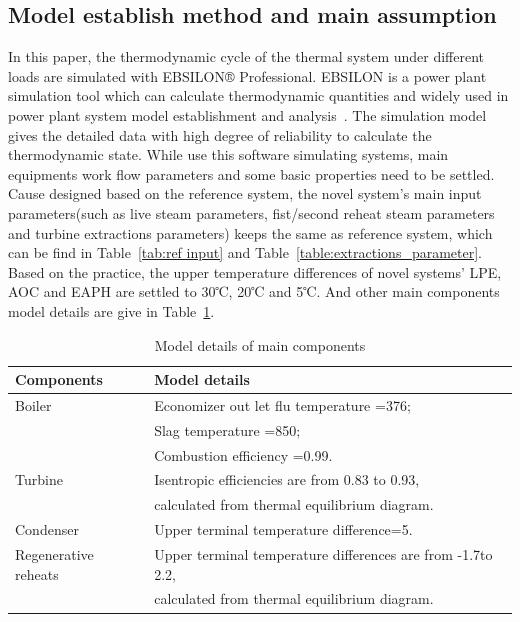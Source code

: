 \documentclass[preprint,12pt]{elsarticle}
\begin{document}
\subsection{Model establish method and main assumption}
\label{ssub3:modle description}
In this paper, the thermodynamic cycle of the thermal system under different loads are simulated with EBSILON® Professional.
EBSILON is a power plant simulation tool which can calculate thermodynamic quantities and widely used in power plant system model establishment and analysis~\cite{Li2015Integrated,Yao2017Multi}. 
The simulation model gives the detailed data with high degree of reliability to calculate the thermodynamic state.
While use this software simulating systems, main equipments work flow parameters and some basic properties need to be settled.
Cause designed based on the reference system, the novel system's main input parameters(such as live steam parameters, fist/second reheat steam parameters and turbine extractions parameters) keeps the same as reference system, which can be find in Table~\ref{tab:ref input} and Table~\ref{table:extractions_parameter}.
Based on the practice, the upper temperature differences of novel systems' LPE, AOC and EAPH are settled to 30℃, 20℃ and 5℃. 
And other main components model details are give in Table~\ref{table:model_details}. 

\begin{table}
\caption{Model details of main components}
\label{table:model_details}
\begin{centering}
\begin{tabular}{ll}
\toprule 
Components 				& Model details\tabularnewline
\midrule
Boiler         			& Economizer out let flu temperature =376\textcelsius ;\tabularnewline
 						& Slag temperature =850\textcelsius ;\tabularnewline
 						& Combustion efficiency =0.99.\tabularnewline
Turbine 				& Isentropic efficiencies are from 0.83 to 0.93, \tabularnewline
 						& calculated from thermal equilibrium diagram.\tabularnewline
Condenser 				& Upper terminal temperature difference=5\textcelsius .\tabularnewline
Regenerative reheats 	& Upper terminal temperature differences are from -1.7\textcelsius{}to 2.2\textcelsius , \tabularnewline
 						& calculated from thermal equilibrium diagram.\tabularnewline
\bottomrule
\end{tabular}
\par\end{centering}
\end{table}
\end{document}
